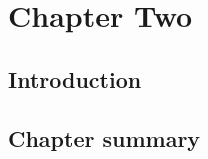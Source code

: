 %
%
\chapter{Chapter Two} \label{chap:two}

\section{Introduction} \label{sec:intro}


\section{Chapter summary}

